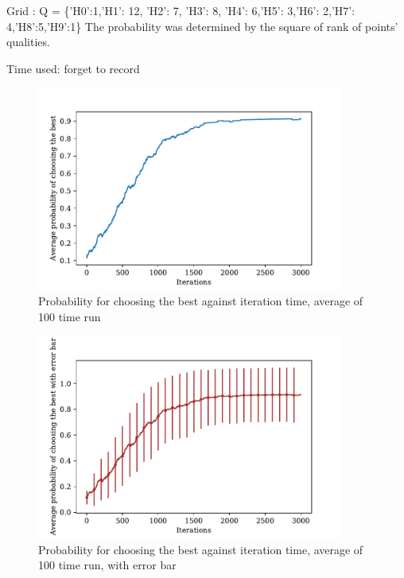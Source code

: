 \documentclass[a4paper,12pt]{article}
\begin{document}
	Grid : Q = \{'H0':1,'H1': 12, 'H2': 7, 'H3': 8, 'H4': 6,'H5': 3,'H6': 2,'H7': 4,'H8':5,'H9':1\}
	The probability was determined by the square of rank of points' qualities.
	\graphicspath{{figsNorm1/}}
	Time used: forget to record%
	\begin{figure}[H]
		\centering
		\includegraphics[width=0.9\textwidth]{Average_pbestnorm1_toss200_3000_100}
		\caption{Probability for choosing the best against iteration time, average of 100 time run}\label{Average_pbestnorm1_toss200_3000_100}
	\end{figure}
	\begin{figure}[H]
		\centering
		\includegraphics[width=0.9\textwidth]{Average_pbest_errbarnorm1_toss200_3000_100}
		\caption{Probability for choosing the best against iteration time, average of 100 time run, with error bar}\label{Average_pbest_errbarnorm1_toss200_3000_100}
	\end{figure}
\end{document}
